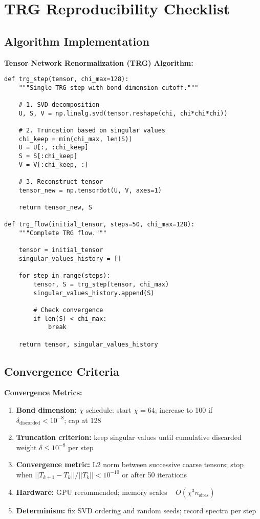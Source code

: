 \documentclass[11pt]{article}
\theoremstyle{definition}
\begin{document}
\section{TRG Reproducibility Checklist}

\subsection{Algorithm Implementation}

\textbf{Tensor Network Renormalization (TRG) Algorithm:}
\begin{verbatim}
def trg_step(tensor, chi_max=128):
    """Single TRG step with bond dimension cutoff."""
    
    # 1. SVD decomposition
    U, S, V = np.linalg.svd(tensor.reshape(chi, chi*chi*chi))
    
    # 2. Truncation based on singular values
    chi_keep = min(chi_max, len(S))
    U = U[:, :chi_keep]
    S = S[:chi_keep]
    V = V[:chi_keep, :]
    
    # 3. Reconstruct tensor
    tensor_new = np.tensordot(U, V, axes=1)
    
    return tensor_new, S

def trg_flow(initial_tensor, steps=50, chi_max=128):
    """Complete TRG flow."""
    
    tensor = initial_tensor
    singular_values_history = []
    
    for step in range(steps):
        tensor, S = trg_step(tensor, chi_max)
        singular_values_history.append(S)
        
        # Check convergence
        if len(S) < chi_max:
            break
    
    return tensor, singular_values_history
\end{verbatim}

\subsection{Convergence Criteria}

\textbf{Convergence Metrics:}
\begin{enumerate}
\item \textbf{Bond dimension:} $\chi$ schedule: start $\chi=64$; increase to 100 if $\delta_{\text{discarded}} < 10^{-8}$; cap at 128
\item \textbf{Truncation criterion:} keep singular values until cumulative discarded weight $\delta \leq 10^{-8}$ per step
\item \textbf{Convergence metric:} L2 norm between successive coarse tensors; stop when $||T_{k+1}-T_k||/||T_k|| < 10^{-10}$ or after 50 iterations
\item \textbf{Hardware:} GPU recommended; memory scales ~ $O(\chi^3 n_{\text{sites}})$
\item \textbf{Determinism:} fix SVD ordering and random seeds; record spectra per step
\end{enumerate}
\end{document}
